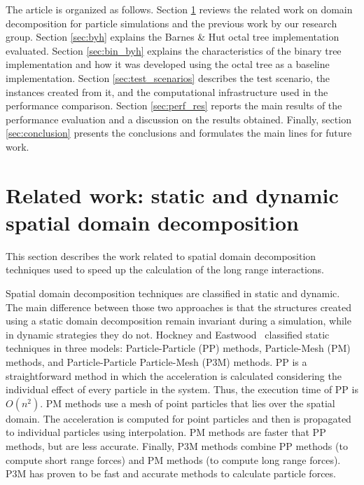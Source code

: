 \documentclass[runningheads]{llncs}
\begin{document}
The article is organized as follows. Section \ref{sec:related_work} reviews the related work on domain decomposition for particle simulations and the previous work by our research group. Section \ref{sec:byh} explains the Barnes \& Hut octal tree implementation evaluated. Section \ref{sec:bin_byh} explains the characteristics of the binary tree implementation and how it was developed using the octal tree as a baseline implementation. Section \ref{sec:test_scenarios} describes the test scenario, the instances created from it, and the computational infrastructure used in the performance comparison. Section \ref{sec:perf_res} reports the main results of the performance evaluation and a discussion on the results obtained. Finally, section \ref{sec:conclusion} presents the conclusions and formulates the main lines for future work. 

\section{Related work: static and dynamic spatial domain decomposition}
\label{sec:related_work}

This section describes the work related to spatial domain decomposition techniques used to speed up the calculation of the long range interactions.

Spatial domain decomposition techniques are classified in static and dynamic. The main difference between those two approaches is that the structures created using a static domain decomposition remain invariant during a simulation, while in dynamic strategies they do not. Hockney and Eastwood~\cite{hockney1988computer} classified static techniques in three models: Particle-Particle (PP) methods, Particle-Mesh (PM) methods, and Particle-Particle Particle-Mesh (P3M) methods. PP is a straightforward method in which the acceleration is calculated considering the individual effect of every particle in the system. Thus, the execution time of PP is $O(n^2)$. PM methods \cite{darden1993particle,essmann1995smooth,sanchez2012simulation,kravtsov1997adaptive} use a mesh of point particles that lies over the spatial domain. The acceleration is computed for point particles and then is propagated to individual particles using interpolation. PM methods are faster that PP methods, but are less accurate. Finally, P3M \cite{couchman1991mesh,macfarland1998new,harnois2013high,brieu1994cosmological} methods combine PP methods (to compute short range forces) and PM methods (to compute long range forces). P3M has proven to be fast and accurate methods to calculate particle forces.
\end{document}
